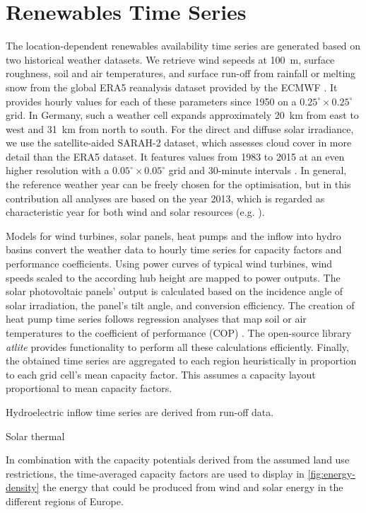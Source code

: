 
\section{Renewables Time Series}

The location-dependent renewables availability time series are generated based
on two historical weather datasets. We retrieve wind sepeeds at
\SI{100}{\metre}, surface roughness, soil and air temperatures, and surface
run-off from rainfall or melting snow from the global ERA5 reanalysis dataset
provided by the ECMWF \citeS{}. It provides hourly values for each of these
parameters since 1950 on a $0.25^{\circ} \times 0.25^{\circ}$ grid. In Germany,
such a weather cell expands approximately \SI{20}{\kilo\metre} from east to west
and \SI{31}{km} from north to south. For the direct and diffuse solar
irradiance, we use the satellite-aided SARAH-2 dataset, which assesses cloud
cover in more detail than the ERA5 dataset. It features values from 1983 to 2015
at an even higher resolution with a $0.05^{\circ} \times 0.05^{\circ}$ grid and
30-minute intervals \citeS{}. In general, the reference weather year can be
freely chosen for the optimisation, but in this contribution all analyses are
based on the year 2013, which is regarded as characteristic year for both wind
and solar resources (e.g. \citeS{}).

Models for wind turbines, solar panels, heat pumps and the inflow into hydro
basins convert the weather data to hourly time series for capacity factors and
performance coefficients. Using power curves of typical wind turbines, wind speeds scaled to the according hub
height are mapped to power outputs. The solar photovoltaic panels' output is
calculated based on the incidence angle of solar irradiation, the panel's tilt
angle, and conversion efficiency. The creation of heat pump time series follows
regression analyses that map soil or air temperatures to the coefficient of
performance (COP) .
The open-source library \textit{atlite} \citeS{} provides functionality to
perform all these calculations efficiently. Finally, the obtained time series
are aggregated to each region heuristically in proportion to each grid cell's
mean capacity factor. This assumes a capacity layout proportional to mean
capacity factors.

Hydroelectric inflow time series are derived from run-off data.

Solar thermal

In combination with the capacity potentials derived from the assumed land use restrictions,
the time-averaged capacity factors are used to display in \cref{fig:energy-density} the energy that could be produced from wind and solar energy in the different regions of Europe.
